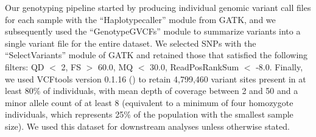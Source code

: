 Our genotyping pipeline started by producing individual genomic variant call files for each sample with the “Haplotypecaller” module from GATK, and we subsequently used the “GenotypeGVCFs” module to summarize variants into a single variant file for the entire dataset. We selected SNPs with the “SelectVariants” module of GATK and retained those that satisfied the following filters: QD $<$ 2, FS $>$ 60.0, MQ $<$ 30.0, ReadPosRankSum $<$ -8.0. Finally, we used VCFtools version 0.1.16 (\cite{danecek2011variant}) to retain 4,799,460 variant sites present in at least 80\% of individuals, with mean depth of coverage between 2 and 50 and a minor allele count of at least 8 (equivalent to a minimum of four homozygote individuals, which represents 25\% of the population with the smallest sample size). We used this dataset for downstream analyses unless otherwise stated.

